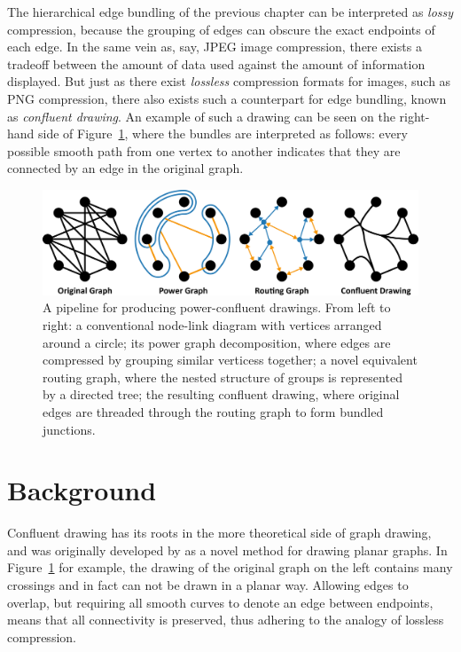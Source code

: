 The hierarchical edge bundling of the previous chapter can be interpreted as \emph{lossy} compression, because the grouping of edges can obscure the exact endpoints of each edge. In the same vein as, say, JPEG image compression, there exists a tradeoff between the amount of data used against the amount of information displayed.
But just as there exist \emph{lossless} compression formats for images, such as PNG compression, there also exists such a counterpart for edge bundling, known as \emph{confluent drawing}. An example of such a drawing can be seen on the right-hand side of Figure~\ref{fig:power_teaser}, where the bundles are interpreted as follows: every possible smooth path from one vertex to another indicates that they are connected by an edge in the original graph.


\begin{figure}
  \centering
  \includegraphics[width=\textwidth]{power/teaser.pdf}
  \caption[A power-confluent drawing pipeline]{A pipeline for producing power-confluent drawings. 
  From left to right: a conventional node-link diagram with vertices arranged around a circle; its power graph decomposition, where edges are compressed by grouping similar verticess together; a novel equivalent routing graph, where the nested structure of groups is represented by a directed tree; the resulting confluent drawing, where original edges are threaded through the routing graph to form bundled junctions.}
  \label{fig:power_teaser}
\end{figure}

\section{Background}
\label{sec:power_background}
Confluent drawing has its roots in the more theoretical side of graph drawing, and was originally developed by \citet{Dickerson2005} as a novel method for drawing planar graphs. In Figure~\ref{fig:power_teaser} for example, the drawing of the original graph on the left contains many crossings and in fact can not be drawn in a planar way. Allowing edges to overlap, but requiring all smooth curves to denote an edge between endpoints, means that all connectivity is preserved, thus adhering to the analogy of lossless compression.

